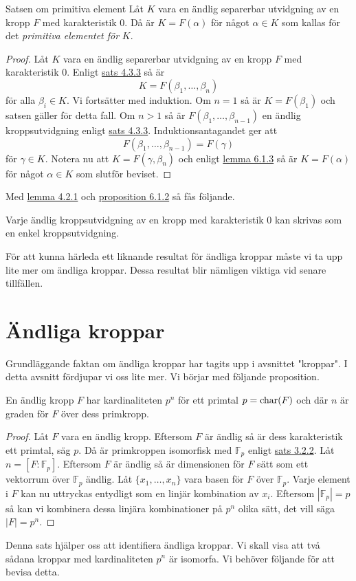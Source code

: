 \documentclass{article}
\newcommand{\kar}[0]{\textnormal{char}}
\theoremstyle{definition}
\begin{document}
\begin{mytheo}{Satsen om primitiva element}{}
  Låt $K$ vara en ändlig separerbar utvidgning av en kropp $F$ med karakteristik 0. Då är $K = F(\alpha)$ för något $\alpha \in K$ som kallas 
  för det \textit{primitiva elementet för} $K$.
\end{mytheo}

\begin{proof}
  Låt $K$ vara en ändlig separerbar utvidgning av en kropp $F$ med karakteristik 0. Enligt \hyperlink{sats5.3.3}{sats 4.3.3} så är 
  \[K = F(\beta_1, \ldots, \beta_n)\]
  för alla $\beta_i \in K.$ Vi fortsätter med induktion. Om $n = 1$ så är $K = F(\beta_1)$ och satsen gäller för detta fall. Om $n > 1$ 
  så är $F(\beta_1, \ldots, \beta_{n-1})$ en ändlig kroppsutvidgning enligt \hyperlink{sats5.3.3}{sats 4.3.3}. Induktionsantagandet ger att 
  \[ F(\beta_1, \ldots, \beta_{n-1}) = F(\gamma) \]
  för $\gamma \in K$. Notera nu att $K = F(\gamma, \beta_n)$ och enligt \hyperlink{lemma7.1.3}{lemma 6.1.3} så är $K = F(\alpha)$ för något $\alpha \in K$
  som slutför beviset.
\end{proof}

Med \hyperlink{algebraiskkropp}{lemma 4.2.1} och \hyperlink{prop7.1.2}{proposition 6.1.2} så fås följande.
\begin{mykol}{}{}
  Varje ändlig kroppsutvidgning av en kropp med karakteristik 0 kan skrivas som en enkel kroppsutvidgning.
\end{mykol}
För att kunna härleda ett liknande resultat för ändliga kroppar måste vi ta upp lite mer om ändliga kroppar. Dessa resultat blir nämligen viktiga 
vid senare tillfällen. 

\section{Ändliga kroppar}
Grundläggande faktan om ändliga kroppar har tagits upp i avsnittet "kroppar". I detta avsnitt fördjupar vi oss lite mer. Vi börjar med 
följande proposition. 
\begin{myprop}{}{}
  En ändlig kropp $F$ har kardinaliteten $p^n$ för ett primtal $p = \kar(F)$ och där $n$ är graden för $F$ över dess primkropp.
\end{myprop}

\begin{proof}
  Låt $F$ vara en ändlig kropp. Eftersom $F$ är ändlig så är dess karakteristik ett primtal, säg $p$. Då är primkroppen isomorfisk med 
  $\mathbb{F}_p$ enligt \hyperlink{primkropp}{sats 3.2.2}. Låt $n = [F:\mathbb{F}_p].$ Eftersom $F$ är ändlig så är dimensionen för $F$ sätt som ett 
  vektorrum över $\mathbb{F}_p$ ändlig. Låt $\{x_1, \ldots, x_n\}$ vara basen för $F$ över $\mathbb{F}_p.$
  Varje element i $F$ kan nu uttryckas entydligt som en linjär kombination av $x_i$. Eftersom $|\mathbb{F}_p| = p$ så 
  kan vi kombinera dessa linjära kombinationer på $p^n$ olika sätt, det vill säga $|F| = p^n.$
\end{proof}
Denna sats hjälper oss att identifiera ändliga kroppar. Vi skall visa att två sådana kroppar med kardinaliteten $p^n$ är isomorfa. 
Vi behöver följande för att bevisa detta.
\end{document}
